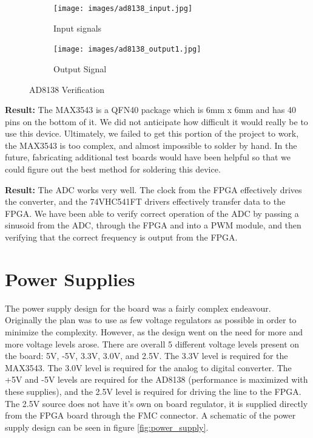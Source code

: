 \documentclass[a4paper, 12pt, notitlepage]{article}
\begin{document}
\begin{figure}[ht]
\centering
\begin{subfigure}[b]{0.45\textwidth}
  \texttt{[image: images/ad8138\_input.jpg]}
  \caption{Input signals}
  \label{fig:ad8138_test1_input}
\end{subfigure}
\begin{subfigure}[b]{0.45\textwidth}
  \texttt{[image: images/ad8138\_output1.jpg]}
  \caption{Output Signal}
  \label{fig:ad8138_test1_output}
\end{subfigure}


\caption{AD8138 Verification}
\label{fig:ad8138_test1}
\end{figure}

\textbf{Result:} The MAX3543 is a QFN40 package which is 6mm x 6mm and has 40 pins on the bottom of it.  We did not anticipate how difficult it would really be to use this device.  Ultimately, we failed to get this portion of the project to work, the MAX3543 is too complex, and almost impossible to solder by hand.  In the future, fabricating additional test boards would have been helpful so that we could figure out the best method for soldering this device.

\textbf{Result:} The ADC works very well.  The clock from the FPGA effectively drives the converter, and the 74VHC541FT drivers effectively transfer data to the FPGA.  We have been able to verify correct operation of the ADC by passing a sinusoid from the ADC, through the FPGA and into a PWM module, and then verifying that the correct frequency is output from the FPGA.

\section{Power Supplies}
The power supply design for the board was a fairly complex endeavour.  Originally the plan was to use as few voltage regulators as possible in order to minimize the complexity.  However, as the design went on the need for more and more voltage levels arose.  There are overall 5 different voltage levels present on the board: 5V, -5V, 3.3V, 3.0V, and 2.5V.  The 3.3V level is required for the MAX3543.  The 3.0V level is required for the analog to digital converter.  The +5V and -5V levels are required for the AD8138 (performance is maximized with these supplies), and the 2.5V level is required for driving the line to the FPGA.  The 2.5V source does not have it's own on board regulator, it is supplied directly from the FPGA board through the FMC connector.  A schematic of the power supply design can be seen in figure \ref{fig:power_supply}.
\end{document}
